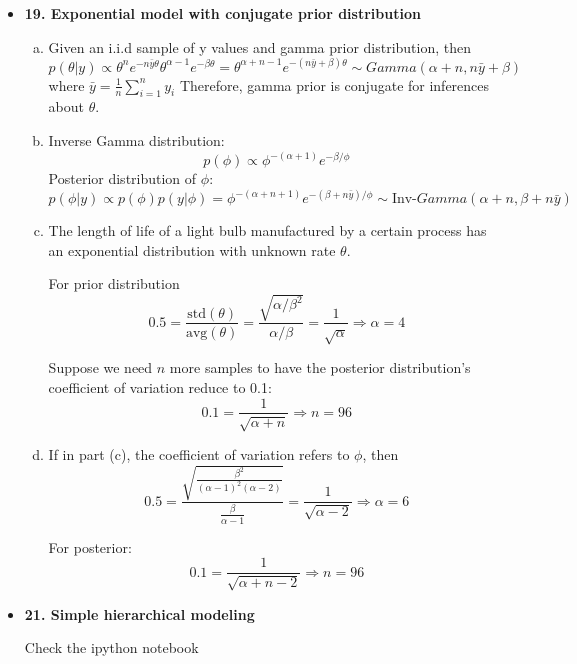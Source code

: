 \documentclass{article}
\begin{document}
\begin{itemize}
\item \textbf{19. Exponential model with conjugate prior distribution}

\begin{enumerate}[(a)]

\item Given an i.i.d sample of y values and gamma prior distribution, then
$$
p(\theta|y) \propto \theta^n e^{-n \bar y \theta} \theta^{\alpha - 1} e^{-\beta \theta} = \theta^{\alpha+n -1} e^{-(n \bar y+\beta)\theta} \sim Gamma(\alpha + n, n \bar y+\beta)
$$
where $\bar y = \frac{1}{n} \sum_{i=1}^n y_i$
Therefore, gamma prior is conjugate for inferences about $\theta$. 

\item Inverse Gamma distribution:
$$
p(\phi) \propto \phi^{-(\alpha+1)}e^{-\beta / \phi}
$$
Posterior distribution of $\phi$:
$$
p(\phi | y) \propto p(\phi) p(y|\phi) = \phi^{-(\alpha+n+1)}e^{-(\beta+n \bar y) / \phi} \sim \text{Inv-}Gamma (\alpha+n, \beta+n\bar y)
$$

\item The length of life of a light bulb  manufactured by a certain process has an exponential distribution with unknown rate $\theta$. 

For prior distribution 
$$
0.5 = \frac{\text{std}(\theta)}{\text{avg}(\theta)} = \frac{\sqrt{\alpha/\beta^2}}{\alpha/\beta} = \frac{1}{\sqrt{\alpha}} \Rightarrow \alpha = 4
$$

Suppose we need $n$ more samples to have the posterior distribution's coefficient of variation reduce to 0.1:
$$
0.1 = \frac{1}{\sqrt{\alpha+n}} \Rightarrow n = 96
$$

\item If in part (c), the coefficient of variation refers to $\phi$, then
$$
0.5 = \frac{\sqrt{\frac{\beta^2}{(\alpha-1)^2(\alpha-2)}}}{\frac{\beta}{\alpha-1}} = \frac{1}{\sqrt{\alpha-2}} \Rightarrow \alpha = 6
$$

For posterior:
$$
0.1 = \frac{1}{\sqrt{\alpha+n-2}} \Rightarrow n = 96
$$

\end{enumerate}

\item \textbf{21. Simple hierarchical modeling}

Check the ipython notebook

\end{itemize}
\end{document}
